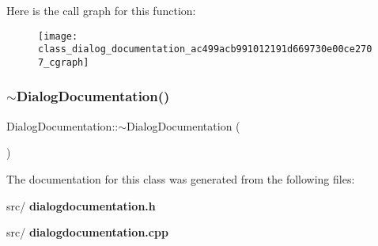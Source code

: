 Here is the call graph for this function\+:\nopagebreak
\begin{figure}[H]
\begin{center}
\leavevmode
\texttt{[image: class\_dialog\_documentation\_ac499acb991012191d669730e00ce2707\_cgraph]}
\end{center}
\end{figure}
\mbox{\label{class_dialog_documentation_ae4fea41bbc228c960476a06dd9fb1b62}} 
\subsubsection{$\sim$\+Dialog\+Documentation()}
{\footnotesize\ttfamily Dialog\+Documentation\+::$\sim$\+Dialog\+Documentation (\begin{DoxyParamCaption}{ }\end{DoxyParamCaption})}



The documentation for this class was generated from the following files\+:\begin{DoxyCompactItemize}
\item 
src/\textbf{ dialogdocumentation.\+h}\item 
src/\textbf{ dialogdocumentation.\+cpp}\end{DoxyCompactItemize}
